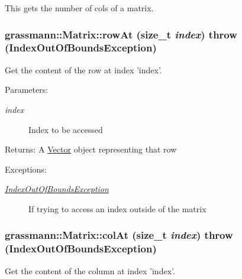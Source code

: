 This gets the number of cols of a matrix. 

\hypertarget{classgrassmann_1_1Matrix_560a478df8082041efaa25a3b372b769}{
\subsubsection[rowAt]{ grassmann::Matrix::rowAt (size\_\-t {\em index})  throw ({\bf IndexOutOfBoundsException})}}
\label{classgrassmann_1_1Matrix_560a478df8082041efaa25a3b372b769}


Get the content of the row at index 'index'. 

\begin{Desc}
\item[Parameters:]
\begin{description}
\item[{\em index}]Index to be accessed \end{description}
\end{Desc}
\begin{Desc}
\item[Returns:]A \hyperlink{classgrassmann_1_1Vector}{Vector} object representing that row \end{Desc}
\begin{Desc}
\item[Exceptions:]
\begin{description}
\item[{\em \hyperlink{classgrassmann_1_1IndexOutOfBoundsException}{IndexOutOfBoundsException}}]If trying to access an index outside of the matrix \end{description}
\end{Desc}
\hypertarget{classgrassmann_1_1Matrix_80df98dc6f86e3cb8eb5621fb0b51179}{
\subsubsection[colAt]{ grassmann::Matrix::colAt (size\_\-t {\em index})  throw ({\bf IndexOutOfBoundsException})}}
\label{classgrassmann_1_1Matrix_80df98dc6f86e3cb8eb5621fb0b51179}


Get the content of the column at index 'index'. 

